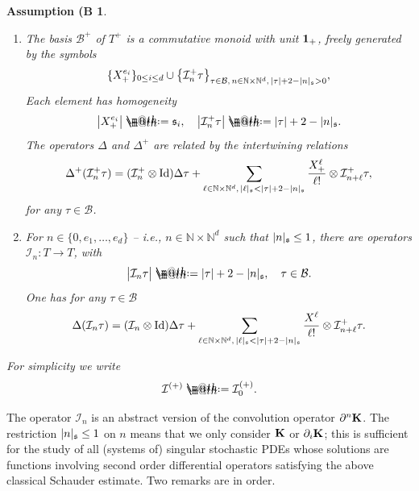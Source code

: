 \documentclass[10pt, reqno]{amsart}
\makeatletter
\numberwithin{subsection}{section}
\numberwithin{subsubsection}{subsection}
\numberwithin{equation}{section} %
\theoremstyle{mystyle}
\theoremstyle{mystyle2}
\theoremstyle{mystyle3}
\newtheorem{assumB}{Assumption (B}
\newcommand{\iden}{\text{\rm Id}}
\newcommand{\copro}{\Delta^+}
\newcommand{\comul}{\Delta}
\newcommand\bbN{\mathbb{N}}
\newcommand{\mcB}{\mathcal{B}}
\newcommand{\mcI}{\mathcal{I}}
\newcommand{\Xplus}{X_+}
\newcommand*{\defeq}{\mathrel{\rlap{%
                     \raisebox{0.3ex}{$\m@th\cdot$}}%
                     \raisebox{-0.3ex}{$\m@th\cdot$}}%
                     =}
\makeatother
\begin{document}
\begin{assumB}\label{B1}
\begin{enumerate}
\setlength{\itemsep}{0.1cm}
   \item The basis $\mcB^+$ of $T^+$ is a commutative monoid with unit ${\bf 1}_+$, freely generated by the symbols
$$
\{\Xplus^{e_i}\}_{0\leq i\leq d} \cup \big\{\mcI_n^+\tau\big\}_{\tau\in\mcB,\, n\in\bbN\times\bbN^d,\,|\tau|+2-|n|_{\frak{s}}>0},
$$
Each element has homogeneity
$$
\big\vert \Xplus^{e_i} \big\vert \defeq  \frak{s}_i,\quad
\big| \mcI^+_n\tau\big| \defeq  |\tau|+2-|n|_\frak{s}.
$$
The operators $\Delta$ and $\Delta^+$ are related by the \emph{intertwining relations}  
   \begin{equation}
   \label{EqIntertwiningDeltaDelta+}
   \copro(\mcI_n^+\tau) = (\mcI_n^+\otimes\iden)\comul\tau + \sum_{\ell\in\bbN\times\bbN^d,\, |\ell|_{\frak{s}}<|\tau|+2-|n|_{\frak{s}}} \frac{\Xplus^\ell}{\ell!}\otimes \mcI_{n+\ell}^+ \tau, 
\end{equation}   
for any $\tau\in\mcB$.   \vspace{0.15cm}

   \item For $n\in\{0,e_1,\dots,e_d\}$ -- i.e., $n\in\bbN\times\bbN^d$ such that $|n|_{\frak{s}}\le1$, there are operators $\mcI_n: T\to T$, with 
   $$
   \big|\mcI_n\tau\big| \defeq  |\tau|+2-|n|_{\frak{s}}, \quad \tau\in
   \mcB.
   $$
One has for any $\tau\in \mcB$
   \begin{equation}
   \label{EqDefnDeltaIkTau}
   \Delta(\mcI_n\tau) = (\mcI_n\otimes\iden)\Delta\tau + \sum_{\ell\in\bbN\times\bbN^d,\, |\ell|_{\frak{s}}<|\tau|+2-|n|_{\frak{s}}} 
   \frac{X^\ell}{\ell!}\otimes \mcI_{n+\ell}^+\tau.
   \end{equation}
\end{enumerate}
For simplicity we write
$$
\mcI^{(+)}\defeq\mcI_0^{(+)}.
$$
\end{assumB}

\medskip

The operator $\mcI_n$ is an abstract version of the convolution operator $\partial^n{\bf K}$. The restriction $|n|_{\frak{s}}\le1$ on $n$ means that we only consider ${\bf K}$ or $\partial_i{\bf K}$; this is sufficient for the study of all (systems of) singular stochastic PDEs whose solutions are functions involving second order differential operators satisfying the above classical Schauder estimate. Two remarks are in order.
\end{document}
